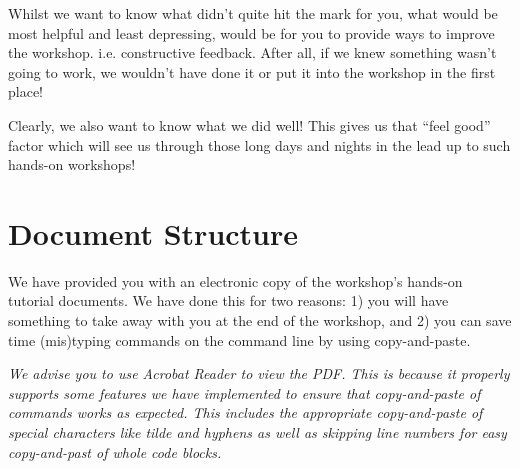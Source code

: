 Whilst we want to know what didn't quite hit the mark for you, what would be most helpful and least
depressing, would be for you to provide ways to improve the workshop. i.e. constructive feedback.
After all, if we knew something wasn't going to work, we wouldn't have done it or put it into the
workshop in the first place!

Clearly, we also want to know what we did well! This gives us that ``feel good'' factor which will see us through those long days and nights in the lead up to such hands-on workshops!
%
%  
%  
%  

\section{Document Structure}
We have provided you with an electronic copy of the workshop's hands-on tutorial documents.
We have done this for two reasons: 1) you will have something to take away with you at the 
end of the workshop, and 2) you can save time (mis)typing commands on the command line by using
copy-and-paste.

\emph{We advise you to use Acrobat Reader to view the PDF. This is because it properly supports some features we have implemented to ensure that copy-and-paste of commands works as expected. This includes the appropriate copy-and-paste of special characters like tilde and hyphens as well as skipping line numbers for easy copy-and-past of whole code blocks.}\\
\\

